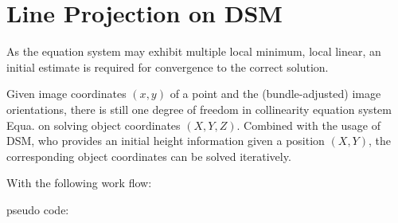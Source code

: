 \section{Line Projection on DSM}
\label{sec:LineProjectionOnDSM}

As the equation system may exhibit multiple local minimum, local linear, an initial estimate is required for convergence to the correct solution. 

Given image coordinates $(x,y)$ of a point and the (bundle-adjusted) image orientations, there is still one degree of freedom in collinearity equation system Equa. on solving object coordinates $(X,Y,Z)$. Combined with the usage of DSM, who provides an initial height information given a position $(X,Y)$, the corresponding object coordinates can be solved iteratively.

With the following work flow:

pseudo code:
















